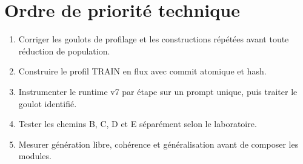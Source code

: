 \documentclass[11pt,a4paper]{report}
\begin{document}
\chapter{Ordre de priorité technique}
\begin{enumerate}
\item Corriger les goulots de profilage et les constructions répétées avant toute réduction de population.
\item Construire le profil TRAIN en flux avec commit atomique et hash.
\item Instrumenter le runtime v7 par étape sur un prompt unique, puis traiter le goulot identifié.
\item Tester les chemins B, C, D et E séparément selon le laboratoire.
\item Mesurer génération libre, cohérence et généralisation avant de composer les modules.
\end{enumerate}
\end{document}
